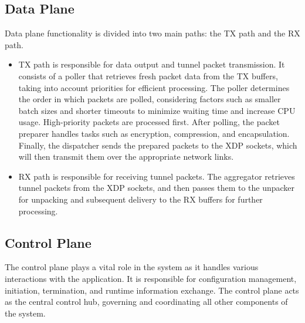 \subsection{Data Plane}
Data plane functionality is divided into two main paths: the TX path and the RX path.
\begin{itemize}
	\item TX path is responsible for data output and tunnel packet transmission. It consists of a poller that retrieves fresh packet data from the TX buffers, taking into account priorities for efficient processing. The poller determines the order in which packets are polled, considering factors such as smaller batch sizes and shorter timeouts to minimize waiting time and increase CPU usage. High-priority packets are processed first. After polling, the packet preparer handles tasks such as encryption, compression, and encapsulation. Finally, the dispatcher sends the prepared packets to the XDP sockets, which will then transmit them over the appropriate network links.
	\item RX path is responsible for receiving tunnel packets. The aggregator retrieves tunnel packets from the XDP sockets, and then passes them to the unpacker for unpacking and subsequent delivery to the RX buffers for further processing.
\end{itemize}

\subsection{Control Plane}
The control plane plays a vital role in the system as it handles various interactions with the application. 
It is responsible for configuration management, initiation, termination, and runtime information exchange. 
The control plane acts as the central control hub, governing and coordinating all other components of the system.

% 

